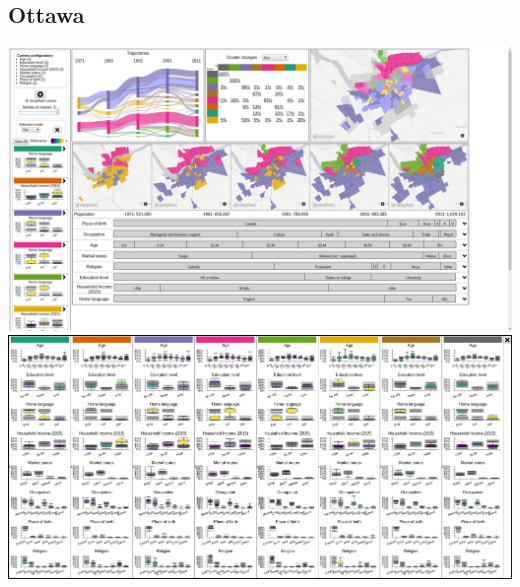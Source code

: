\documentclass[a4paper]{article}
\begin{document}
\subsection{Ottawa}
\begin{center}
	\includegraphics[width=\linewidth]{4a.png}
	\includegraphics[width=\linewidth]{4b.png}
\end{center}
\end{document}
